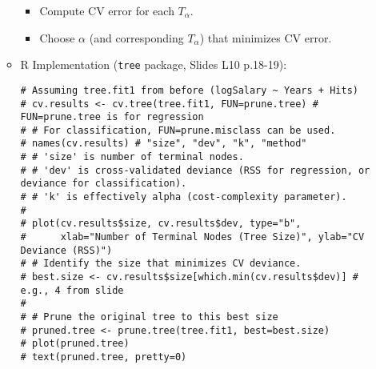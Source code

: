 \documentclass[12pt,a4paper]{article}
\newcommand{\Rpackage}[1]{\texttt{#1}} %
\begin{document}
\begin{itemize}
\begin{itemize}
\begin{itemize}
                    \item Compute CV error for each $T_\alpha$.
                    \item Choose $\alpha$ (and corresponding $T_\alpha$) that minimizes CV error.
                \end{itemize}
            \item R Implementation (\Rpackage{tree} package, Slides L10 p.18-19):
\begin{lstlisting}[caption={Pruning a Regression Tree (Slides L10 p.18-19)}]
# Assuming tree.fit1 from before (logSalary ~ Years + Hits)
# cv.results <- cv.tree(tree.fit1, FUN=prune.tree) # FUN=prune.tree is for regression
# # For classification, FUN=prune.misclass can be used.
# names(cv.results) # "size", "dev", "k", "method"
# # 'size' is number of terminal nodes.
# # 'dev' is cross-validated deviance (RSS for regression, or deviance for classification).
# # 'k' is effectively alpha (cost-complexity parameter).
# 
# plot(cv.results$size, cv.results$dev, type="b", 
#      xlab="Number of Terminal Nodes (Tree Size)", ylab="CV Deviance (RSS)")
# # Identify the size that minimizes CV deviance.
# best.size <- cv.results$size[which.min(cv.results$dev)] # e.g., 4 from slide
# 
# # Prune the original tree to this best size
# pruned.tree <- prune.tree(tree.fit1, best=best.size)
# plot(pruned.tree)
# text(pruned.tree, pretty=0)
\end{lstlisting}
        \end{itemize}


\end{itemize}
\end{document}
